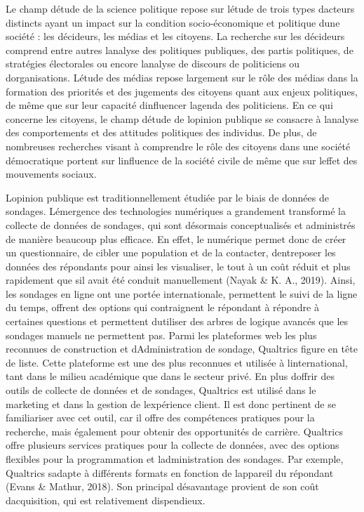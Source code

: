 \documentclass[
  letterpaper,
  DIV=11,
  numbers=noendperiod]{scrreprt}
\begin{document}
Le champ d\textquotesingle étude de la science politique repose sur
l\textquotesingle étude de trois types d\textquotesingle acteurs
distincts ayant un impact sur la condition socio-économique et politique
d\textquotesingle une société : les décideurs, les médias et les
citoyens. La recherche sur les décideurs comprend entre autres
l\textquotesingle analyse des politiques publiques, des partis
politiques, de stratégies électorales ou encore
l\textquotesingle analyse de discours de politiciens ou
d\textquotesingle organisations. L\textquotesingle étude des médias
repose largement sur le rôle des médias dans la formation des priorités
et des jugements des citoyens quant aux enjeux politiques, de même que
sur leur capacité d\textquotesingle influencer l\textquotesingle agenda
des politiciens. En ce qui concerne les citoyens, le champ
d\textquotesingle étude de l\textquotesingle opinion publique se
consacre à l\textquotesingle analyse des comportements et des attitudes
politiques des individus. De plus, de nombreuses recherches visant à
comprendre le rôle des citoyens dans une société démocratique portent
sur l\textquotesingle influence de la société civile de même que sur
l\textquotesingle effet des mouvements sociaux.~

L\textquotesingle opinion publique est traditionnellement étudiée par le
biais de données de sondages. L\textquotesingle émergence des
technologies numériques a grandement transformé la collecte de données
de sondages, qui sont désormais conceptualisés et administrés de manière
beaucoup plus efficace. En effet, le numérique permet donc de créer un
questionnaire, de cibler une population et de la contacter,
d\textquotesingle entreposer les données des répondants pour ainsi les
visualiser, le tout à un coût réduit et plus rapidement que
s\textquotesingle il avait été conduit manuellement (Nayak \& K. A.,
2019). Ainsi, les sondages en ligne ont une portée internationale,
permettent le suivi de la ligne du temps, offrent des options qui
contraignent le répondant à répondre à certaines questions et permettent
d\textquotesingle utiliser des arbres de logique avancés que les
sondages manuels ne permettent pas. Parmi les plateformes web les plus
reconnues de construction et d\textquotesingle Administration de
sondage, Qualtrics figure en tête de liste. Cette plateforme est une des
plus reconnues et utilisée à l\textquotesingle international, tant dans
le milieu académique que dans le secteur privé. En plus
d\textquotesingle offrir des outils de collecte de données et de
sondages, Qualtrics est utilisé dans le marketing et dans la gestion de
l\textquotesingle expérience client. Il est donc pertinent de se
familiariser avec cet outil, car il offre des compétences pratiques pour
la recherche, mais également pour obtenir des opportunités de carrière.
Qualtrics offre plusieurs services pratiques pour la collecte de
données, avec des options flexibles pour la programmation et
l\textquotesingle administration des sondages. Par exemple, Qualtrics
s\textquotesingle adapte à différents formats en fonction de
l\textquotesingle appareil du répondant (Evans \& Mathur, 2018). Son
principal désavantage provient de son coût
d\textquotesingle acquisition, qui est relativement dispendieux.~
\end{document}
